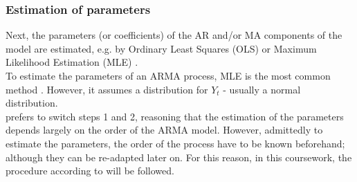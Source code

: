\documentclass[a4paper, 11pt]{article}
\begin{document}
\subsubsection{Estimation of parameters}
Next, the parameters (or coefficients) of the AR and/or MA components of the model are estimated, e.g. by Ordinary Least Squares (OLS) or Maximum Likelihood Estimation (MLE) \citep{Andreoni.2006b}.  \\
To estimate the parameters of an ARMA process, MLE is the most common method \citep{Vogel.2015}. However, it assumes a distribution for $Y_{t}$ - usually a normal distribution.
\\
\cite{Vogel.2015} prefers to switch steps 1 and 2, reasoning that the estimation of the parameters depends largely on the order of the ARMA model. However, admittedly to estimate the parameters, the order of the process have to be known beforehand; although they can be re-adapted later on.
For this reason, in this coursework, the procedure according to \cite{Box.1976} will be followed.\\
\\
\end{document}
